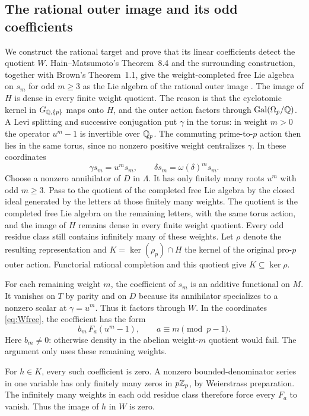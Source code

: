 \subsection{The rational outer image and its odd coefficients}

We construct the rational target and prove that its linear
coefficients detect the quotient $W$.
Hain--Matsumoto's Theorem~8.4 and the surrounding construction,
together with Brown's Theorem~1.1, give the weight-completed
free Lie algebra on $s_m$ for odd $m\geq3$ as the Lie algebra
of the rational outer image \cite{HM,Brown}.
The image of $H$ is dense in every finite weight quotient.
The reason is that the cyclotomic kernel in
$G_{\mathbb Q,\{p\}}$ maps onto $H$, and the outer action factors
through $\operatorname{Gal}(\Omega_p/\mathbb Q)$.
A Levi splitting and successive conjugation put $\gamma$
in the torus: in weight $m>0$ the operator $u^m-1$ is
invertible over $\mathbb Q_p$. The commuting prime-to-$p$ action
then lies in the same torus, since no nonzero positive weight
centralizes $\gamma$. In these coordinates
\[
           \gamma s_m=u^ms_m,\qquad
           \delta s_m=\omega(\delta)^m s_m.
\]
Choose a nonzero annihilator of $D$ in $\Lambda$. It has
only finitely many roots $u^m$ with odd $m\geq3$.
Pass to the quotient of the completed free Lie algebra by
the closed ideal generated by the letters at those finitely
many weights. The quotient is the completed free Lie algebra
on the remaining letters, with the same torus action, and
the image of $H$ remains dense in every finite weight quotient.
Every odd residue class still contains infinitely many of
these weights. Let $\rho$ denote the resulting representation
and $K=\ker(\rho_p)\cap H$ the kernel of the original
pro-$p$ outer action. Functorial rational completion and
this quotient give $K\subseteq\ker\rho$.

For each remaining weight $m$, the coefficient of $s_m$
is an additive functional on $M$. It vanishes on $T$ by
parity and on $D$ because its annihilator specializes to
a nonzero scalar at $\gamma=u^m$. Thus it factors through $W$.
In the coordinates \eqref{eq:Wfree}, the coefficient has
the form
\[
              b_m\,F_a(u^m-1),\qquad a\equiv m\pmod{p-1}.
\]
Here $b_m\ne0$: otherwise density in the abelian weight-$m$
quotient would fail. The argument only uses these remaining weights.

For $h\in K$, every such coefficient is zero. A nonzero
bounded-denominator series in one variable has only finitely
many zeros in $p\mathbb Z_p$, by Weierstrass preparation. The
infinitely many weights in each odd residue class therefore
force every $F_a$ to vanish. Thus the image of $h$ in $W$
is zero.


